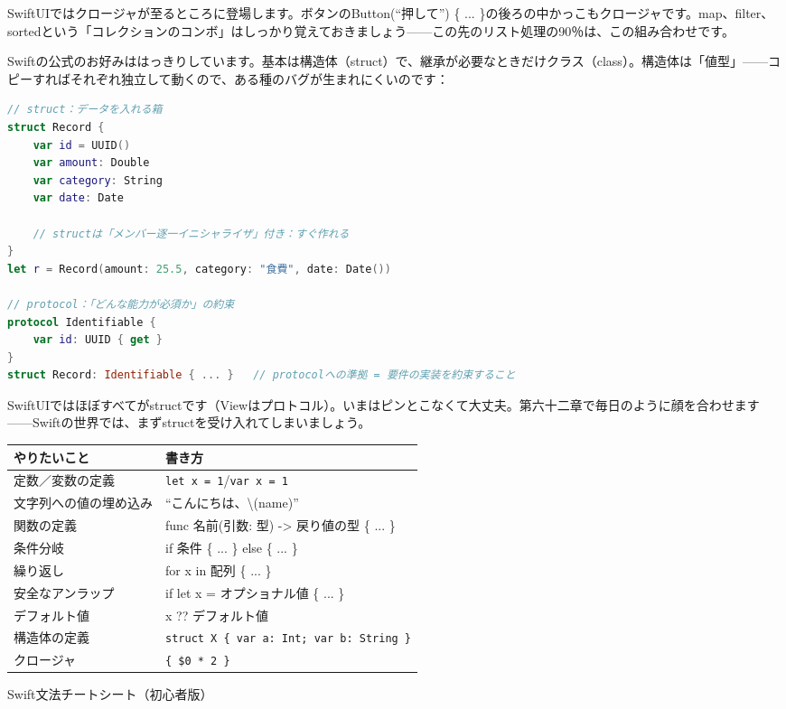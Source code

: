 SwiftUIではクロージャが至るところに登場します。ボタンのButton(“押して”) \{ ... \}の後ろの中かっこもクロージャです。map、filter、sortedという「コレクションのコンボ」はしっかり覚えておきましょう——この先のリスト処理の90％は、この組み合わせです。


Swiftの公式のお好みははっきりしています。基本は構造体（struct）で、継承が必要なときだけクラス（class）。構造体は「値型」——コピーすればそれぞれ独立して動くので、ある種のバグが生まれにくいのです：

\begin{lstlisting}[language=Swift]
// struct：データを入れる箱
struct Record {
    var id = UUID()
    var amount: Double
    var category: String
    var date: Date

    // structは「メンバー逐一イニシャライザ」付き：すぐ作れる
}
let r = Record(amount: 25.5, category: "食費", date: Date())

// protocol：「どんな能力が必須か」の約束
protocol Identifiable {
    var id: UUID { get }
}
struct Record: Identifiable { ... }   // protocolへの準拠 = 要件の実装を約束すること
\end{lstlisting}

SwiftUIではほぼすべてがstructです（Viewはプロトコル）。いまはピンとこなくて大丈夫。第六十二章で毎日のように顔を合わせます——Swiftの世界では、まずstructを受け入れてしまいましょう。


\begin{center}
\begin{tabularx}{\linewidth}{|X|X|}
\hline
\textbf{やりたいこと} & \textbf{書き方} \tabularnewline
\hline
定数／変数の定義 & \texttt{let x = 1}/\texttt{var x = 1} \tabularnewline
文字列への値の埋め込み & “こんにちは、\textbackslash{}(name)” \tabularnewline
関数の定義 & func 名前(引数: 型) -> 戻り値の型 \{ ... \} \tabularnewline
条件分岐 & if 条件 \{ ... \} else \{ ... \} \tabularnewline
繰り返し & for x in 配列 \{ ... \} \tabularnewline
安全なアンラップ & if let x = オプショナル値 \{ ... \} \tabularnewline
デフォルト値 & x ?? デフォルト値 \tabularnewline
構造体の定義 & \texttt{struct X \{ var a: Int; var b: String \}} \tabularnewline
クロージャ & \texttt{\{ \$0 * 2 \}} \tabularnewline
\hline
\end{tabularx}
\end{center}

\begin{center}\small\color{gray}Swift文法チートシート（初心者版）\end{center}

